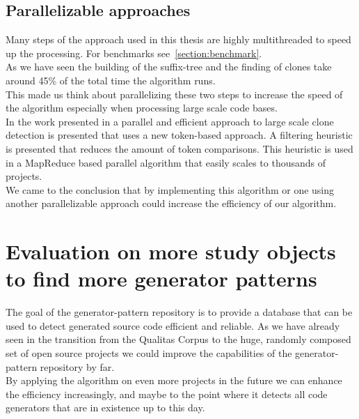 \subsection{Parallelizable approaches}
Many steps of the approach used in this thesis are highly multithreaded to speed up the processing. For benchmarks see~\ref{section:benchmark}.\\
As we have seen the building of the suffix-tree and the finding of clones take around 45\% of the total time the algorithm runs. \\
This made us think about parallelizing these two steps to increase the speed of the algorithm especially when processing large scale code bases.\\
In the work presented in \cite{Sajnani2013} a parallel and efficient approach to large scale clone detection is presented that uses a new token-based approach. A filtering heuristic is presented that reduces the amount of token comparisons. This heuristic is used in a MapReduce based parallel algorithm that easily scales to thousands of projects.\\
We came to the conclusion that by implementing this algorithm or one using another parallelizable approach could increase the efficiency of our algorithm. 


\section{Evaluation on more study objects to find more generator patterns}
The goal of the generator-pattern repository is to provide a database that can be used to detect generated source code efficient and reliable. As we have already seen in the transition from the Qualitas Corpus to the huge, randomly composed set of open source projects we could improve the capabilities of the generator-pattern repository by far.\\
By applying the algorithm on even more projects in the future we can enhance the efficiency increasingly, and maybe to the point where it detects all code generators that are in existence up to this day.